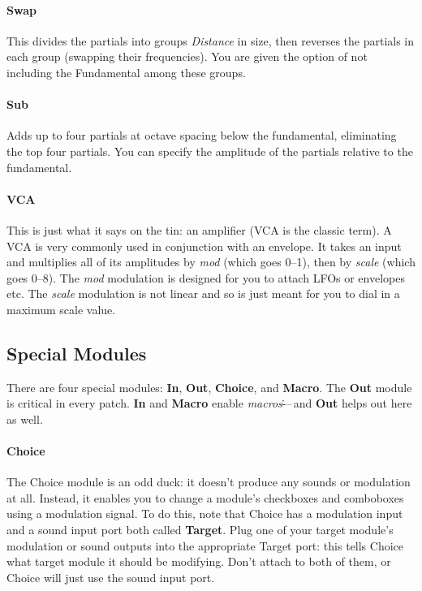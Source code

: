\documentclass{article}
\begin{document}
\paragraph{Swap} This divides the partials into groups {\it Distance} in size, then reverses the partials in each group (swapping their frequencies).  You are given the option of not including the Fundamental among these groups.

\paragraph{Sub} Adds up to four partials at octave spacing below the fundamental, eliminating the top four partials.  You can specify the amplitude of the partials relative to the fundamental.

\paragraph{VCA} This is just what it says on the tin: an amplifier (VCA is the classic term).  A VCA is very commonly used in conjunction with an envelope.  It takes an input and multiplies all of its amplitudes by {\it mod} (which goes 0--1), then by {\it scale} (which goes 0--8).  The {\it mod} modulation is designed for you to attach LFOs or envelopes etc.  The {\it scale} modulation is not linear and so is just meant for you to dial in a maximum scale value. 

\subsection{Special Modules}

There are four special modules: {\bf In}, {\bf Out}, {\bf Choice}, and {\bf Macro}.  The {\bf Out} module is critical in every patch.  {\bf In} and {\bf Macro} enable {\it macros}\.---\,and {\bf Out} helps out here as well.

\paragraph{Choice}  The Choice module is an odd duck: it doesn't produce any sounds or modulation at all.  Instead, it enables you to change a module's checkboxes and comboboxes using a modulation signal.  To do this, note that Choice has a modulation input and a sound input port both called {\bf Target}.   Plug one of your target module's modulation or sound outputs into the appropriate Target port: this tells Choice what target module it should be modifying.  Don't attach to both of them, or Choice will just use the sound input port.
\end{document}
